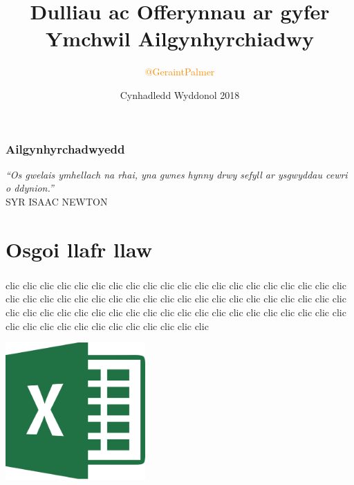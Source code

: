 \documentclass{beamer}
\title{Dulliau ac Offerynnau ar gyfer Ymchwil Ailgynhyrchiadwy}
\author{\textcolor{darkorange}{@GeraintPalmer}}
\date{Cynhadledd Wyddonol 2018}
\begin{document}
\frame{\titlepage}
\begin{frame}
\frametitle{Ailgynhyrchadwyedd}
\begin{center}
  \textit{``Os gwelais ymhellach na rhai, yna gwnes hynny drwy sefyll ar ysgwyddau cewri o ddynion.''}\\
  \vspace{0.75cm}
  \small{SYR ISAAC NEWTON}
\end{center}
\end{frame}

\begin{frame}
\begin{center}
  
\end{center}
\end{frame}

\begin{frame}
\frametitle{\hfill}
\tableofcontents
\end{frame}

\section[]{Osgoi llafr llaw}
\begin{frame}
\frametitle{\hfill}
\end{frame}

\begin{frame}
\huge{
  clic clic clic clic clic clic clic clic clic clic clic clic clic clic clic clic clic clic clic clic clic clic clic clic clic clic clic clic clic clic clic clic clic clic clic clic clic clic clic clic clic clic clic clic clic clic clic clic clic clic clic clic clic clic clic clic clic clic clic clic clic clic clic clic clic clic clic clic clic clic clic clic
}
\end{frame}

\begin{frame}
\begin{center}
  \includegraphics[width=0.4\textwidth]{excellogo}
\end{center}
\end{frame}
\end{document}

